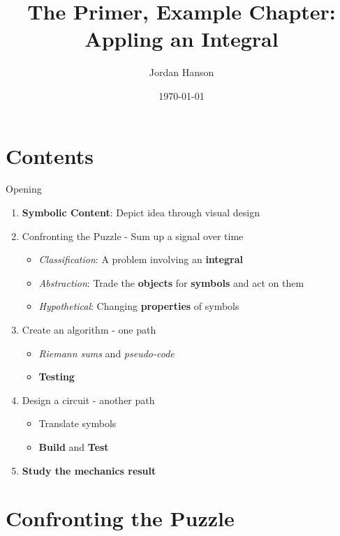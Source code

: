 \documentclass{beamer}
\title{The Primer, Example Chapter: Appling an Integral}
\date{\today}
\author{Jordan Hanson}
\institute{Whittier College Department of Physics and Astronomy}
\begin{document}
\maketitle

\section{Contents}

\begin{frame}{Opening}
\begin{enumerate}
\small
\item \textbf{\alert{Symbolic Content}}: Depict idea through visual design
\item Confronting the Puzzle - Sum up a signal over time
\begin{itemize}
\item \textit{\alert{Classification}}: A problem involving an \textbf{integral}
\item \textit{\alert{Abstraction}}: Trade the \textbf{objects} for \textbf{symbols} and act on them
\item \textit{\alert{Hypothetical}}: Changing \textbf{properties} of symbols
\end{itemize}
\item Create an algorithm - one path
\begin{itemize}
\item \textit{Riemann sums} and \textit{pseudo-code}
\item \textbf{Testing}
\end{itemize}
\item Design a circuit - another path
\begin{itemize}
\item Translate symbols
\item \textbf{Build} and \textbf{Test}
\end{itemize}
\item \textbf{\alert{Study the mechanics result}}
\end{enumerate}
\end{frame}

\section{Confronting the Puzzle}
\end{document}

